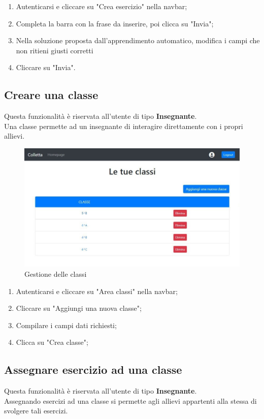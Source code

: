 \documentclass[11pt,a4paper]{article}
\begin{document}
{		\begin{enumerate}
			\item Autenticarsi e cliccare su "Crea esercizio" nella navbar;
			\item Completa la barra con la frase da inserire, poi clicca su "Invia";
			\item Nella soluzione proposta dall'apprendimento automatico, modifica i campi che non ritieni giusti corretti
			\item Cliccare su "Invia". 
		\end{enumerate}

	\subsection{Creare una classe}
		Questa funzionalità è riservata all'utente di tipo \textbf{Insegnante}.\\
		Una classe permette ad un insegnante di interagire direttamente con i propri allievi.
		
			\begin{figure}[h!]
				\centering
				\includegraphics[scale=0.65]{images/classi.jpg}
				\caption{Gestione delle classi}
			\end{figure}
	
		\begin{enumerate}
			\item Autenticarsi e cliccare su "Area classi" nella navbar;
			\item Cliccare su "Aggiungi una nuova classe";
			\item Compilare i campi dati richiesti;
			\item Clicca su "Crea classe";
		\end{enumerate}
	
	\subsection{Assegnare esercizio ad una classe}
		Questa funzionalità è riservata all'utente di tipo \textbf{Insegnante}.\\
		Assegnando esercizi ad una classe si permette agli allievi appartenti alla stessa di svolgere tali esercizi.
		
}
\end{document}
